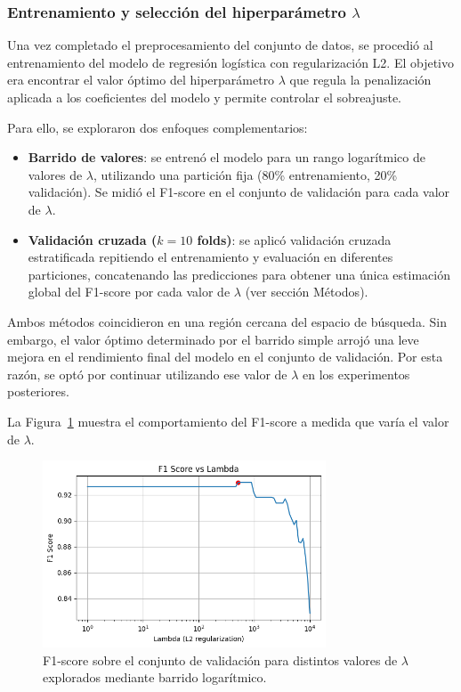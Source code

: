 \documentclass[11pt]{article}
\begin{document}
\subsubsection*{Entrenamiento y selección del hiperparámetro $\lambda$}

Una vez completado el preprocesamiento del conjunto de datos, se procedió al entrenamiento del modelo de regresión logística con regularización L2. El objetivo era encontrar el valor óptimo del hiperparámetro $\lambda$ que regula la penalización aplicada a los coeficientes del modelo y permite controlar el sobreajuste.

Para ello, se exploraron dos enfoques complementarios:

\begin{itemize}
    \item \textbf{Barrido de valores}: se entrenó el modelo para un rango logarítmico de valores de $\lambda$, utilizando una partición fija (80\% entrenamiento, 20\% validación). Se midió el F1-score en el conjunto de validación para cada valor de $\lambda$.
    \item \textbf{Validación cruzada ($k=10$ folds)}: se aplicó validación cruzada estratificada repitiendo el entrenamiento y evaluación en diferentes particiones, concatenando las predicciones para obtener una única estimación global del F1-score por cada valor de $\lambda$ (ver sección Métodos).
\end{itemize}

Ambos métodos coincidieron en una región cercana del espacio de búsqueda. Sin embargo, el valor óptimo determinado por el barrido simple arrojó una leve mejora en el rendimiento final del modelo en el conjunto de validación. Por esta razón, se optó por continuar utilizando ese valor de $\lambda$ en los experimentos posteriores.

La Figura~\ref{fig:lambda_search} muestra el comportamiento del F1-score a medida que varía el valor de $\lambda$.

\begin{figure}[H]
    \centering
    \includegraphics[width=0.75\textwidth]{figures/lambda_search.png}
    \caption{F1-score sobre el conjunto de validación para distintos valores de $\lambda$ explorados mediante barrido logarítmico.}
    \label{fig:lambda_search}
\end{figure}
\end{document}
